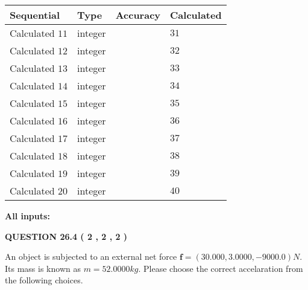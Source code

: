 \documentclass[12pt]{article}
\begin{document}
  
\noindent\begin{tabular}{|l|l|l|l|}
\hline
 Sequential & Type & Accuracy & Calculated \\ 
\hline
 
 
  Calculated $           11 $ & integer &  & 
  $ 31 $ 
 \\  \hline  
 
 
  Calculated $           12 $ & integer &  & 
  $ 32 $ 
 \\  \hline  
 
 
  Calculated $           13 $ & integer &  & 
  $ 33 $ 
 \\  \hline  
 
 
  Calculated $           14 $ & integer &  & 
  $ 34 $ 
 \\  \hline  
 
 
  Calculated $           15 $ & integer &  & 
  $ 35 $ 
 \\  \hline  
 
 
  Calculated $           16 $ & integer &  & 
  $ 36 $ 
 \\  \hline  
 
 
  Calculated $           17 $ & integer &  & 
  $ 37 $ 
 \\  \hline  
 
 
  Calculated $           18 $ & integer &  & 
  $ 38 $ 
 \\  \hline  
 
 
  Calculated $           19 $ & integer &  & 
  $ 39 $ 
 \\  \hline  
 
 
  Calculated $           20 $ & integer &  & 
  $ 40 $ 
 \\  \hline  
 \end{tabular}
   
   
   
   
\noindent\vspace{0.1in}\hspace{-0.08in} {\textbf{\Large{All inputs: }}}
   
   
  
\vspace{0.2in}
  
{\textbf{\Large{QUESTION
26.4 
 (           2 ,           2 ,           2 )
}}}
  
  
 
An object is subjected to an external net force $\mathbf{f}=(
30.000 ,
3.0000,
-9000.0  )N$. Its mass is known as
$m= %
52.0000  kg$. Please choose the correct accelaration
from the following choices.
 
\end{document}
